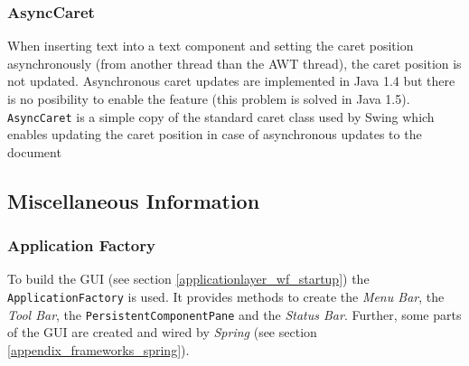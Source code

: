 \subsubsection{AsyncCaret}
When inserting text into a text component and setting the caret position asynchronously (from another thread than the AWT thread), the caret position is not updated. Asynchronous caret updates are implemented in Java 1.4 but there is no posibility to enable the feature (this problem is solved in Java 1.5). \texttt{Async\-Caret} is a simple copy of the standard caret class used by Swing which enables updating the caret position in case of asynchronous updates to the document

\subsection{Miscellaneous Information}
\subsubsection{Application Factory}
\label{applicationlayer_applicationfactory}
To build the GUI (see section \ref{applicationlayer_wf_startup}) the \texttt{Application\-Factory} is used. It provides methods to create the \emph{Menu Bar}, the \emph{Tool Bar}, the \texttt{Persistent\-Component\-Pane} and the \emph{Status Bar}. Further, some parts of the GUI are created and wired by \emph{Spring} (see section \ref{appendix_frameworks_spring}). 


%    
%    



